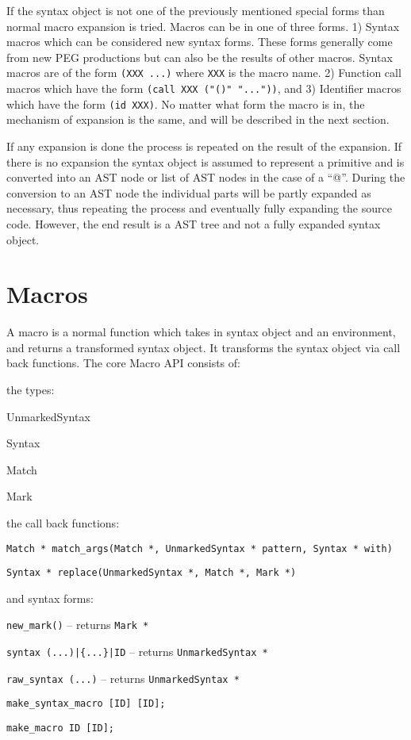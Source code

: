 \documentclass[12pt,english,letterpaper]{article}
\begin{document}
If the syntax object is not one of the previously mentioned special
forms than normal macro expansion is tried.  Macros can be in one of
three forms. 1) Syntax macros which can be considered new syntax
forms.  These forms generally come from new PEG productions but can
also be the results of other macros.  Syntax macros are of the form
\verb/(XXX ...)/ where \verb/XXX/ is the macro name.  2) Function call
macros which have the form \verb/(call XXX ("()" "..."))/, and 3)
Identifier macros which have the form \verb/(id XXX)/.  No matter what
form the macro is in, the mechanism of expansion is the same, and
will be described in the next section.

If any expansion is done the process is repeated on the result of the
expansion.  If there is no expansion the syntax object is assumed to
represent a primitive and is converted into an AST node or list of AST
nodes in the case of a ``@''.  During the conversion to an AST node
the individual parts will be partly expanded as necessary, thus
repeating the process and eventually fully expanding the source code.
However, the end result is a AST tree and not a fully expanded syntax
object.

\section{Macros}
\label{macros}

A macro is a normal function which takes in syntax object and an
environment, and returns a transformed syntax object.  It transforms the
syntax object via call back functions.  The core Macro API consists of:
\begin{itemize*}
\item the types:
\begin{itemize*}
\item UnmarkedSyntax
\item Syntax
\item Match
\item Mark
\end{itemize*}
\item the call back functions:
\begin{itemize*}
\item \verb/Match * match_args(Match *, UnmarkedSyntax * pattern, Syntax * with)/
\item \verb/Syntax * replace(UnmarkedSyntax *, Match *, Mark *)/
\end{itemize*}
\item and syntax forms:
\begin{itemize*}
\item \verb/new_mark()/ -- returns \verb/Mark */
\item \verb/syntax (...)|{...}|ID/ -- returns \verb/UnmarkedSyntax */
\item \verb/raw_syntax (...)/ -- returns \verb/UnmarkedSyntax */
\item \verb/make_syntax_macro [ID] [ID];/
\item \verb/make_macro ID [ID];/
\end{itemize*}
\end{itemize*}
\end{document}
